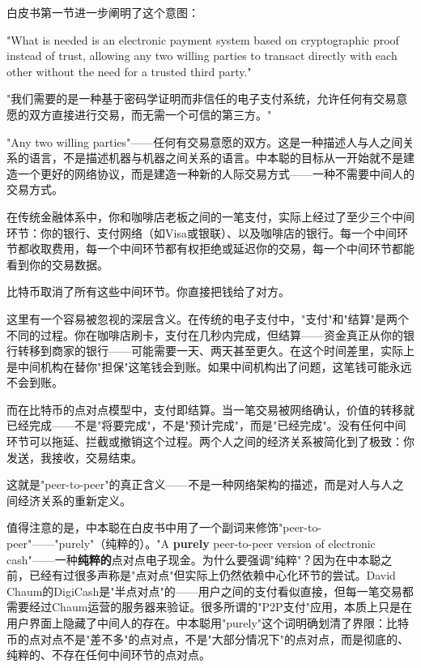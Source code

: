 \documentclass[a4paper,12pt,openany]{ctexbook}
\newenvironment{quoting}{%
  \par\vspace{0.5em}%
  \begin{list}{}{%
    \setlength{\leftmargin}{2em}%
    \setlength{\rightmargin}{2em}%
    \setlength{\parsep}{0.3em}%
    \setlength{\itemsep}{0pt}%
    \setlength{\topsep}{0pt}%
  }%
  \item\relax
}{%
  \end{list}%
  \par\vspace{0.5em}%
}
\begin{document}
白皮书第一节进一步阐明了这个意图：


\begin{quoting}
\small
"What is needed is an electronic payment system based on cryptographic proof instead of trust, allowing any two willing parties to transact directly with each other without the need for a trusted third party."

"我们需要的是一种基于密码学证明而非信任的电子支付系统，允许任何有交易意愿的双方直接进行交易，而无需一个可信的第三方。"
\end{quoting}


"Any two willing parties"——任何有交易意愿的双方。这是一种描述人与人之间关系的语言，不是描述机器与机器之间关系的语言。中本聪的目标从一开始就不是建造一个更好的网络协议，而是建造一种新的人际交易方式——一种不需要中间人的交易方式。

在传统金融体系中，你和咖啡店老板之间的一笔支付，实际上经过了至少三个中间环节：你的银行、支付网络（如Visa或银联）、以及咖啡店的银行。每一个中间环节都收取费用，每一个中间环节都有权拒绝或延迟你的交易，每一个中间环节都能看到你的交易数据。

比特币取消了所有这些中间环节。你直接把钱给了对方。

这里有一个容易被忽视的深层含义。在传统的电子支付中，"支付"和"结算"是两个不同的过程。你在咖啡店刷卡，支付在几秒内完成，但结算——资金真正从你的银行转移到商家的银行——可能需要一天、两天甚至更久。在这个时间差里，实际上是中间机构在替你"担保"这笔钱会到账。如果中间机构出了问题，这笔钱可能永远不会到账。

而在比特币的点对点模型中，支付即结算。当一笔交易被网络确认，价值的转移就已经完成——不是"将要完成"，不是"预计完成"，而是"已经完成"。没有任何中间环节可以拖延、拦截或撤销这个过程。两个人之间的经济关系被简化到了极致：你发送，我接收，交易结束。

这就是"peer-to-peer"的真正含义——不是一种网络架构的描述，而是对人与人之间经济关系的重新定义。

值得注意的是，中本聪在白皮书中用了一个副词来修饰"peer-to-peer"——"purely"（纯粹的）。"A \textbf{purely} peer-to-peer version of electronic cash"——一种\textbf{纯粹的}点对点电子现金。为什么要强调"纯粹"？因为在中本聪之前，已经有过很多声称是"点对点"但实际上仍然依赖中心化环节的尝试。David Chaum的DigiCash是"半点对点"的——用户之间的支付看似直接，但每一笔交易都需要经过Chaum运营的服务器来验证。很多所谓的"P2P支付"应用，本质上只是在用户界面上隐藏了中间人的存在。中本聪用"purely"这个词明确划清了界限：比特币的点对点不是"差不多"的点对点，不是"大部分情况下"的点对点，而是彻底的、纯粹的、不存在任何中间环节的点对点。
\end{document}
